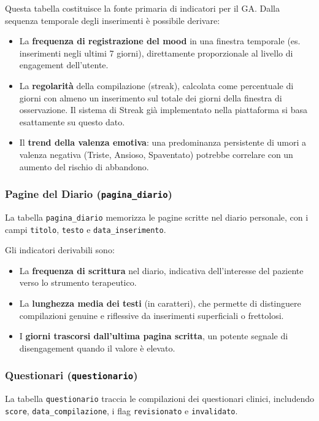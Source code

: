 Questa tabella costituisce la fonte primaria di indicatori per il GA. Dalla sequenza temporale degli inserimenti è possibile derivare:
\begin{itemize}
    \item La \textbf{frequenza di registrazione del mood} in una finestra temporale (es. inserimenti negli ultimi 7 giorni), direttamente proporzionale al livello di engagement dell'utente.
    \item La \textbf{regolarità} della compilazione (streak), calcolata come percentuale di giorni con almeno un inserimento sul totale dei giorni della finestra di osservazione. Il sistema di Streak già implementato nella piattaforma si basa esattamente su questo dato.
    \item Il \textbf{trend della valenza emotiva}: una predominanza persistente di umori a valenza negativa (Triste, Ansioso, Spaventato) potrebbe correlare con un aumento del rischio di abbandono.
\end{itemize}

\subsubsection{Pagine del Diario (\texttt{pagina\_diario})}

La tabella \texttt{pagina\_diario} memorizza le pagine scritte nel diario personale, con i campi \texttt{titolo}, \texttt{testo} e \texttt{data\_inserimento}.

Gli indicatori derivabili sono:
\begin{itemize}
    \item La \textbf{frequenza di scrittura} nel diario, indicativa dell'interesse del paziente verso lo strumento terapeutico.
    \item La \textbf{lunghezza media dei testi} (in caratteri), che permette di distinguere compilazioni genuine e riflessive da inserimenti superficiali o frettolosi.
    \item I \textbf{giorni trascorsi dall'ultima pagina scritta}, un potente segnale di disengagement quando il valore è elevato.
\end{itemize}

\subsubsection{Questionari (\texttt{questionario})}

La tabella \texttt{questionario} traccia le compilazioni dei questionari clinici, includendo \texttt{score}, \texttt{data\_compilazione}, i flag \texttt{revisionato} e \texttt{invalidato}.

